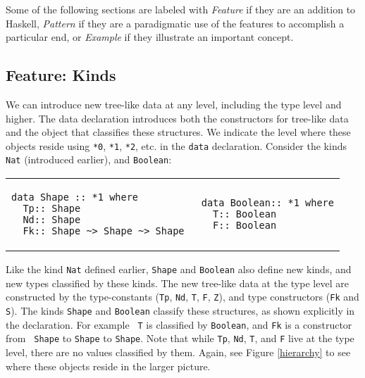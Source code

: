 \documentclass[11pt,twoside,A4]{llncs}
\begin{document}
Some of the following sections are labeled with {\em Feature} if they
are an addition to Haskell, {\em Pattern} if they are a paradigmatic
use of the features to accomplish a particular end, or {\em Example} if
they illustrate an important concept.

\vspace*{0.1in}

\subsection{Feature: Kinds} \label{shape} We can introduce new tree-like data at any level,
including the type level and higher. The data declaration introduces both the constructors for
tree-like data and the object that classifies these structures. We
indicate the level where these objects reside using \verb+*0+, \verb+*1+,
\verb+*2+, etc. in the \verb+data+ declaration. Consider the kinds {\tt Nat} (introduced earlier), and
{\tt Boolean}:
 
\vspace*{.15in}
\begin{tabular}{l|l}
\begin{minipage}[t]{2.2in}
{\small
\begin{verbatim}
data Shape :: *1 where 
  Tp:: Shape
  Nd:: Shape
  Fk:: Shape ~> Shape ~> Shape

\end{verbatim}}
\end{minipage}
&
\begin{minipage}[t]{2.2in}
{\small
\begin{verbatim}
 data Boolean:: *1 where
   T:: Boolean
   F:: Boolean  
\end{verbatim}}
\end{minipage}
\end{tabular}
\vspace*{0.1in}

\noindent
Like the kind {\tt Nat} defined earlier, {\tt Shape} and {\tt Boolean}
also define new kinds, and new types classified by these kinds. The new
tree-like data at the type level are constructed by the type-constants
({\tt Tp}, {\tt Nd}, {\tt T}, {\tt F}, {\tt Z}), and type constructors
({\tt Fk} and {\tt S}). The kinds {\tt Shape} and {\tt Boolean} classify
these structures, as shown explicitly in the declaration. For example {\tt
T} is classified by {\tt Boolean}, and {\tt Fk} is a constructor from {\tt
Shape} to {\tt Shape} to {\tt Shape}. Note that while {\tt Tp}, {\tt Nd},
{\tt T}, and {\tt F}  live at the type level, there are no values
classified by them. Again, see Figure \ref{hierarchy} to see where these
objects reside in the larger picture.
\end{document}
